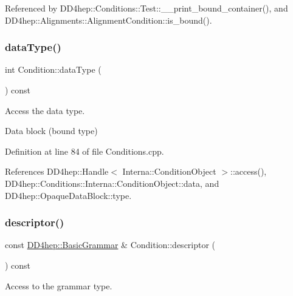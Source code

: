 Referenced by D\+D4hep\+::\+Conditions\+::\+Test\+::\+\_\+\+\_\+print\+\_\+bound\+\_\+container(), and D\+D4hep\+::\+Alignments\+::\+Alignment\+Condition\+::is\+\_\+bound().

\hypertarget{class_d_d4hep_1_1_conditions_1_1_condition_ac207d21e451115f030cd7de5c7db130b}{}\label{class_d_d4hep_1_1_conditions_1_1_condition_ac207d21e451115f030cd7de5c7db130b} 
\subsubsection{\texorpdfstring{data\+Type()}{dataType()}}
{\footnotesize\ttfamily int Condition\+::data\+Type (\begin{DoxyParamCaption}{ }\end{DoxyParamCaption}) const}



Access the data type. 

Data block (bound type) 

Definition at line 84 of file Conditions.\+cpp.



References D\+D4hep\+::\+Handle$<$ Interna\+::\+Condition\+Object $>$\+::access(), D\+D4hep\+::\+Conditions\+::\+Interna\+::\+Condition\+Object\+::data, and D\+D4hep\+::\+Opaque\+Data\+Block\+::type.

\hypertarget{class_d_d4hep_1_1_conditions_1_1_condition_a503d8aa496e640f607625cfac506f512}{}\label{class_d_d4hep_1_1_conditions_1_1_condition_a503d8aa496e640f607625cfac506f512} 
\subsubsection{\texorpdfstring{descriptor()}{descriptor()}}
{\footnotesize\ttfamily const \hyperlink{class_d_d4hep_1_1_basic_grammar}{D\+D4hep\+::\+Basic\+Grammar} \& Condition\+::descriptor (\begin{DoxyParamCaption}{ }\end{DoxyParamCaption}) const}



Access to the grammar type. 



